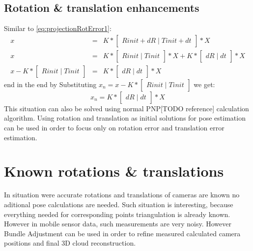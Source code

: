 \subsection{Rotation \& translation enhancements}
Similar to \ref{eq:projectionRotError1}:
\begin{equation} \label{eq:projectionRotError3}
\begin{array}{rcl}
 x & = & K * \begin{bmatrix}Rinit + dR\mid Tinit + dt\end{bmatrix} * X \\
 x & = & K * \begin{bmatrix}Rinit\mid Tinit\end{bmatrix} * X + K * \begin{bmatrix}dR\mid dt\end{bmatrix} * X \\
 x - K * \begin{bmatrix}Rinit\mid Tinit\end{bmatrix} & = & K * \begin{bmatrix}dR\mid dt\end{bmatrix} * X
\end{array}
\end{equation}
end in the end by Substituting $x_{n} = x - K * \begin{bmatrix}Rinit\mid Tinit\end{bmatrix}$ we get: 
\begin{equation} \label{eq:projectionRotError4}
x_{n} = K * \begin{bmatrix}dR\mid dt\end{bmatrix} * X
\end{equation}
This situation can also be solved using normal PNP[TODO reference] calculation algorithm. Using rotation and translation as initial solutions for pose estimation can be used in order to focus only on rotation error and translation error estimation.
\section{Known rotations \& translations}
In situation were accurate rotations and translations of cameras are known no aditional pose calculations are needed. Such situation is interesting, because everything needed for corresponding points triangulation is already known. However in mobile sensor data, such measurements are very noisy. However Bundle Adjustment can be used in order to refine measured calculated camera positions and final 3D cloud reconstruction.
